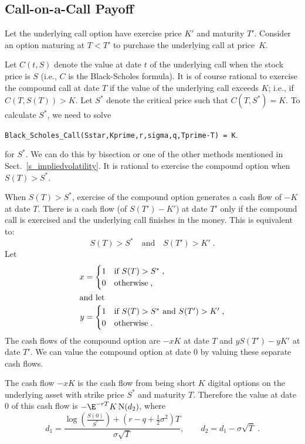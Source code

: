 \subsection*{Call-on-a-Call Payoff}

Let the underlying call option have exercise price $K'$ and maturity $T'$.  Consider an option maturing at $T<T'$ to purchase the underlying call at price~$K$.

Let $C(t,S)$ denote the value at date $t$ of the underlying call when the stock price is $S$ (i.e., $C$ is the Black-Scholes formula).    It is of course rational to exercise the compound call at date $T$ if the value of the underlying call exceeds $K$; i.e., if $C(T,S(T))>K$.  Let $S^*$ denote the critical price such that $C(T,S^*)=K$.  To calculate $S^*$, we need to solve
\begin{center}
\verb!Black_Scholes_Call(Sstar,Kprime,r,sigma,q,Tprime-T) = K!.
\end{center}
for $S^*$.  We can do this by bisection or one of the other methods mentioned in Sect.~\ref{s_impliedvolatility}.
It is rational to exercise the compound option 
when
$S(T) > S^*$.  

When $S(T) > S^*$,  exercise of the compound option generates a cash flow of $-K$ at date $T$.  There is a cash flow (of $S(T')-K'$) at date $T'$ only if the compound call is exercised and the underlying call finishes in the money.  This is equivalent to:
\begin{equation}\label{compound1}
S(T) > S^* \quad\text{and}\quad S(T')>K'\;.
\end{equation}
Let
\begin{align*}
x&= \begin{cases} 1 &\text{if $S(T)>S^*$\;,}\\
                               0 & \text{otherwise\;,}
        \end{cases}\\
\intertext{and let}
y&= \begin{cases} 1 &\text{if $S(T)>S^*$ and $S(T')>K'$\;,}\\
                               0 & \text{otherwise\;.}
        \end{cases} 
\end{align*} 
The cash flows of the compound option are $-xK$ at date $T$ and $yS(T')-yK'$ at date $T'$.  We can value the compound option at date 0 by valuing these separate cash flows.

The cash flow $-xK$ is the cash flow from being short $K$ digital options on the underlying asset with strike price $S^*$ and maturity $T$.  Therefore the value at date 0 of this cash flow is $-\E^{-rT}K\N(d_2)$, where
\begin{equation}\label{calloncalld1d2}
d_1 = \frac{\log\left(\frac{S(0)}{S^*}\right)+\left(r-q+\frac{1}{2}\sigma^2\right)T}{\sigma\sqrt{T}},  \qquad d_2 = d_1-\sigma\sqrt{T}\;.
\end{equation}


